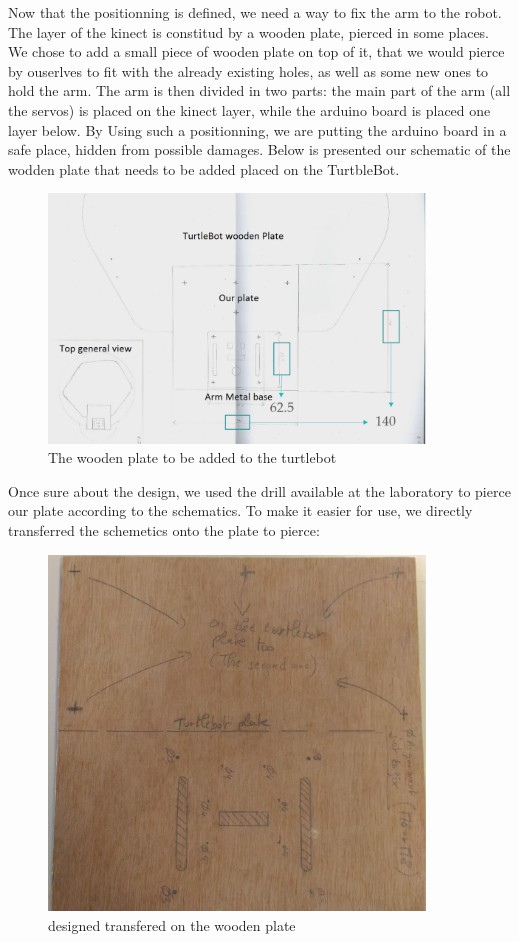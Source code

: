 \documentclass[aps,letterpaper,11pt]{revtex4}
\begin{document}
Now that the positionning is defined, we need a way to fix the arm to the robot. The layer of the kinect is constitud by a wooden plate, pierced in some places. We chose to add a small piece of wooden plate on top of it, that we would pierce by ouserlves to fit with the already existing holes, as well as some new ones to hold the arm. 
The arm is then divided in two parts: the main part of the arm (all the servos) is placed on the kinect layer, while the arduino board is placed one layer below. By Using such a positionning, we are putting the arduino board in a safe place, hidden from possible damages.
Below is presented our schematic of the wodden plate that needs to be added placed on the TurtbleBot.

\begin{figure}[H]
	\centering
	\includegraphics[width=10cm]{plate.png}
	\caption{The wooden plate to be added to the turtlebot}
	\label{fig: plate}    
\end{figure} 

Once sure about the design, we used the drill available at the laboratory to pierce our plate according to the schematics. To make it easier for use, we directly transferred the schemetics onto the plate to pierce:
\begin{figure}[H]
	\centering
	\includegraphics[width=10cm]{wood.jpg}
	\caption{designed transfered on the wooden plate}
	\label{fig: wood design}    
\end{figure} 
\end{document}
